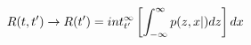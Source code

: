 \begin{equation}
R(t,t') \to R(t') = \\int_{t'}^\infty \left[ \int_{-\infty}^\infty p(z,x|) dz \right] dx
\end{equation}